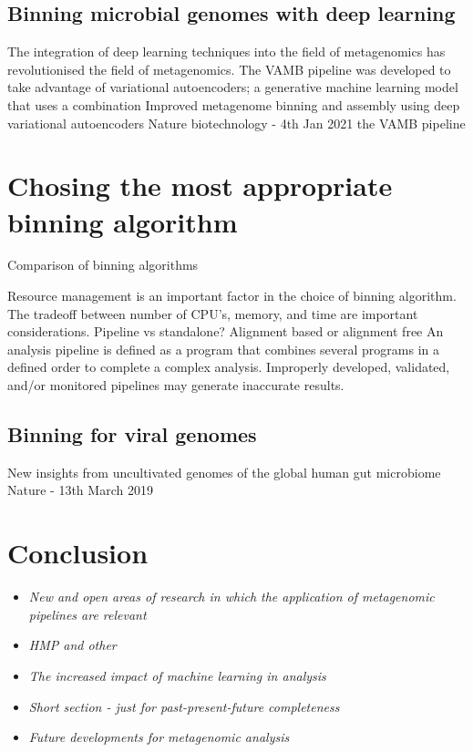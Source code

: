 \documentclass{article}
\begin{document}
\subsection{Binning microbial genomes with deep learning}
The integration of deep learning techniques into the field of metagenomics has revolutionised the field of metagenomics.
The VAMB pipeline was developed to take advantage of variational autoencoders; a generative machine learning model that uses a combination 
Improved metagenome binning and assembly using deep variational autoencoders
Nature biotechnology - 4th Jan 2021
the VAMB pipeline \cite{nissenimproved}

\section{Chosing the most appropriate binning algorithm}
\begin{sidewaystable}
\begin{tiny}
\centering
\caption[Comparison of binning algorithms]{Comparison of binning algorithms}
	
\label{Tbinningsoftware}
\end{tiny}
\end{sidewaystable}

Resource management is an important factor in the choice of binning algorithm.
The tradeoff between number of CPU's, memory, and time are important considerations.
Pipeline vs standalone?
Alignment based or alignment free
An analysis pipeline is defined as a program that combines several programs in a defined order to complete a complex analysis.
Improperly developed, validated, and/or monitored pipelines may generate inaccurate results. 

\subsection{Binning for viral genomes}
New insights from uncultivated genomes of the global human gut microbiome
Nature - 13th March 2019 \cite{nayfach2019new}

\section{Conclusion}
\begin{itemize}
	\item \emph{New and open areas of research in which the application of metagenomic pipelines are relevant}
	\item \emph{HMP and other }
	\item \emph{The increased impact of machine learning in analysis}
	\item \emph{Short section - just for past-present-future completeness}
	\item \emph{Future developments for metagenomic analysis}
\end{itemize}
\end{document}
